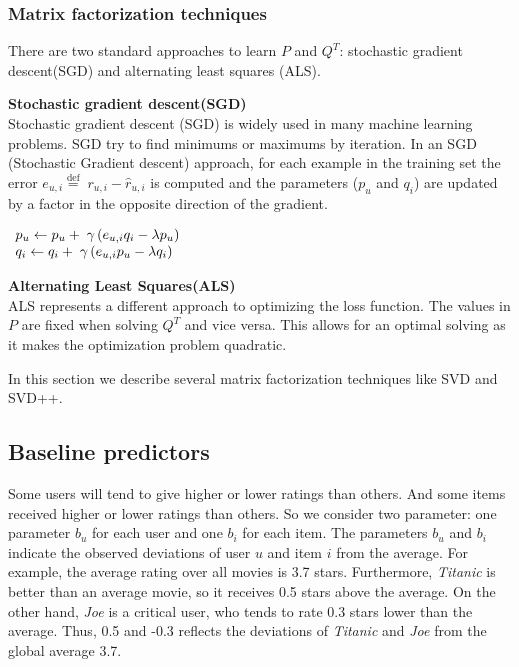 \documentclass[oneside,13pt]{extreport}
\begin{document}
\subsubsection{Matrix factorization techniques}
There are two standard approaches to learn $P$ and $Q^T$: stochastic
gradient descent(SGD) and alternating least squares (ALS).
\begin{description}
    \item{\textbf{Stochastic gradient descent(SGD)}} 
    \\Stochastic gradient descent (SGD) is widely used in many machine learning problems. SGD try to find minimums or maximums by iteration. In an SGD (Stochastic Gradient descent) approach, for each example in the training set the error ${e_{u,i}} \stackrel{\text{def}}{=} \;{r_{u,i}} - \hat r_{u,i}$ is computed and the parameters ($p_u$ and $q_i$) are updated by a factor in the opposite direction of the gradient.

$\begin{array}{l}{p_u} \leftarrow {p_u} + {\rm{\;}}\gamma \left( {{e_{u,i}}{q_i} - \lambda {p_u}} \right)\\{q_i} \leftarrow {q_i} + {\rm{\;}}\gamma \left( {{e_{u,i}}{p_u} - \lambda {q_i}} \right)\end{array}
$    
    
    \item{\textbf{Alternating Least Squares(ALS)}}
    \\ALS represents a different approach to optimizing the loss function. The values in $P$ are fixed when solving $Q^T$ and vice versa. This allows for an optimal solving as it makes the
optimization problem quadratic. 
\end{description}

In this section we describe several matrix factorization techniques like SVD and SVD++.

\subsection{Baseline predictors}
 Some users will tend to give higher or lower ratings than others. And some items received higher or lower ratings than others. So we consider two parameter: one parameter $b_u$ for each user and one $b_i$ for each item. The parameters $b_u$ and $b_i$ indicate the observed deviations of user $u$ and item $i$ from the average. For example, the average rating over all movies is 3.7 stars. Furthermore, \emph{Titanic} is better than an average movie, so it receives 0.5 stars above the average. On the other hand, \emph{Joe} is a critical user, who tends to rate 0.3 stars lower than the average. Thus, 0.5 and -0.3 reflects the deviations of \emph{Titanic} and \emph{Joe} from the global average 3.7. 
 
\end{document}
